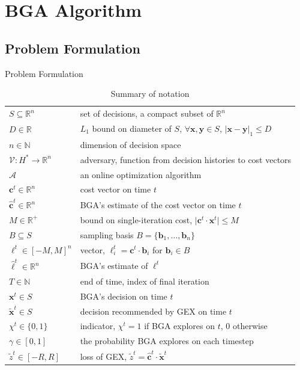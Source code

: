 \documentclass{beamer}
\begin{document}
\section{BGA Algorithm}
\subsection{Problem Formulation}
\begin{frame}{Problem Formulation}
    \scriptsize
    \begin{table}[H]
        \centering
        \caption{Summary of notation}
        \begin{tabular}{ll}
        \hline
        $S \subseteq \mathbb{R}^n$ & set of decisions, a compact subset of $\mathbb{R}^n$ \\
        $D \in \mathbb{R}$ & $L_1$ bound on diameter of $S$, $\forall \mathbf{x}, \mathbf{y} \in S$, $\lvert \mathbf{x} - \mathbf{y} \rvert_1 \leq D$ \\
        $n \in \mathbb{N}$ & dimension of decision space \\
        $\mathcal{V} : H^* \to \mathbb{R}^n$ & adversary, function from decision histories to cost vectors \\
        $\mathcal{A}$ & an online optimization algorithm \\
        $\mathbf{c}^t \in \mathbb{R}^n$ & cost vector on time $t$ \\
        $\hat{\mathbf{c}}^t \in \mathbb{R}^n$ & BGA's estimate of the cost vector on time $t$ \\
        $M \in \mathbb{R}^+$ & bound on single-iteration cost, $\lvert \mathbf{c}^t \cdot \mathbf{x}^t \rvert \leq M$ \\
        $B \subseteq S$ & sampling basis $B = \{\mathbf{b}_1, \ldots, \mathbf{b}_n\}$ \\
        $\ell^t \in [-M, M]^n$ & vector, $\ell^t_i = \mathbf{c}^t \cdot \mathbf{b}_i$ for $\mathbf{b}_i \in B$ \\
        $\hat{\ell}^t \in \mathbb{R}^n$ & BGA's estimate of $\ell^t$ \\
        $T \in \mathbb{N}$ & end of time, index of final iteration \\
        $\mathbf{x}^t \in S$ & BGA's decision on time $t$ \\
        $\tilde{\mathbf{x}}^t \in S$ & decision recommended by GEX on time $t$ \\
        $\chi^t \in \{0, 1\}$ & indicator, $\chi^t = 1$ if BGA explores on $t$, $0$ otherwise \\
        $\gamma \in [0, 1]$ & the probability BGA explores on each timestep \\
        $\tilde{z}^t \in [-R, R]$ & loss of GEX, $\tilde{z}^t = \hat{\mathbf{c}}^t \cdot \tilde{\mathbf{x}}^t$ \\
        \hline
        \end{tabular}
        \end{table}
\end{frame}
\end{document}
